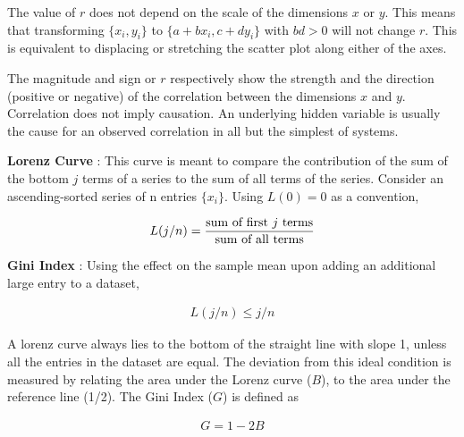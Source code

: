 The value of $ r $ does not depend on the scale of the dimensions $ x $ or $ y $. This means that transforming $ \{x_i , y_i\} $ to $ \{a + b x_i , c + d y_i\} $ with $ bd > 0 $ will not change $ r $. This is equivalent to displacing or stretching the scatter plot along either of the axes.

The magnitude and sign or $ r $ respectively show the strength and the direction (positive or negative) of the correlation between the dimensions $ x $ and $ y $. Correlation does not imply causation. An underlying hidden variable is usually the cause for an observed correlation in all but the simplest of systems.

\textbf{Lorenz Curve} : This curve is meant to compare the contribution of the sum of the bottom $ j $ terms of a series to the sum of all terms of the series. Consider an ascending-sorted series of n entries $ \{x_i\} $. Using $ L(0) = 0 $ as a convention,  

\begin{align}
	L(j/n) = \frac{\text{sum of first $ j $ terms}}{\text{sum of all terms}}
\end{align}

\textbf{Gini Index} : Using the effect on the sample mean upon adding an additional large entry to a dataset, 

\begin{align}
	L(j/n) \leq j / n
\end{align}

A lorenz curve always lies to the bottom of the straight line with slope 1, unless all the entries in the dataset are equal. The deviation from this ideal condition is measured by relating the area under the Lorenz curve ($ B $), to the area under the reference line (1/2). The Gini Index ($ G $) is defined as

 \begin{align}
 	G = 1 - 2B
 \end{align}

\newpage

